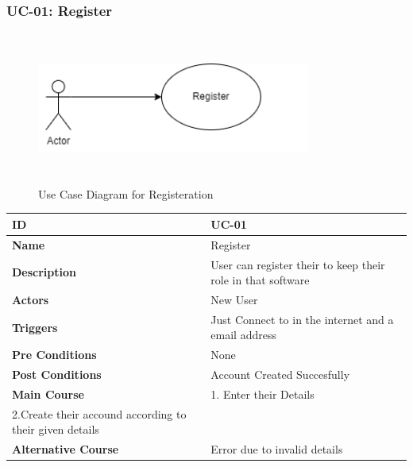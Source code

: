 \setcounter{figure}{0}
\subsubsection{UC-01: Register}
    \begin{figure}[H]
    \includegraphics[height=5cm, width=0.8\textwidth]{./diagrams/Use Case/u1.png}
    \centering 
    \caption{Use Case Diagram for Registeration}
    \label{figure1}
    \end{figure}
    
    \begin{center}
        \begin{tabularx}{\textwidth}{|l|X|}
            \hline
            \textbf{ID} & UC-01 \\
            \hline
            \textbf{Name} & Register \\
            \hline
            \textbf{Description} & User can register their to keep their role in that software \\
            \hline
            \textbf{Actors} & New User \\
            \hline
            \textbf{Triggers} & Just Connect to in the internet and a email address \\
            \hline
            \textbf{Pre Conditions} & None \\
            \hline
            \textbf{Post Conditions} & Account Created Succesfully \\
            \hline
            \textbf{Main Course} & 1. Enter their Details \\2.Create their accound according to their given details \\
            \hline
            \textbf{Alternative Course} & Error due to invalid details \\
            \hline
            
        \end{tabularx}
    \end{center}
    \newpage
    

